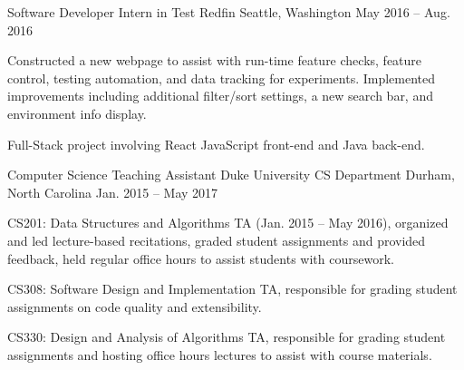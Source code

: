 \begin{cventries}
{\begin{cvitems}
      \end{cvitems}
    }
  \cventry
    {Software Developer Intern in Test}
    {Redfin}
    {Seattle, Washington}
    {May 2016 -- Aug. 2016}
    {
      \begin{cvitems}
        \item {Constructed a new webpage to assist with run-time feature checks, feature control, testing automation, and data tracking for experiments. Implemented improvements including additional filter/sort settings, a new search bar, and environment info display.}
        \item {Full-Stack project involving React JavaScript front-end and Java back-end.}
      \end{cvitems}
    }
  \cventry
    {Computer Science Teaching Assistant}
    {Duke University CS Department}
    {Durham, North Carolina}
    {Jan. 2015 -- May 2017}
    {
      \begin{cvitems}
        \item {CS201: Data Structures and Algorithms TA (Jan. 2015 -- May 2016), organized and led lecture-based recitations, graded student assignments and provided feedback, held regular office hours to assist students with coursework.}
        \item {CS308: Software Design and Implementation TA, responsible for grading student assignments on code quality and extensibility.}
        \item {CS330: Design and Analysis of Algorithms TA, responsible for grading student assignments and hosting office hours lectures to assist with course materials.}
      \end{cvitems}
    }
\end{cventries}
